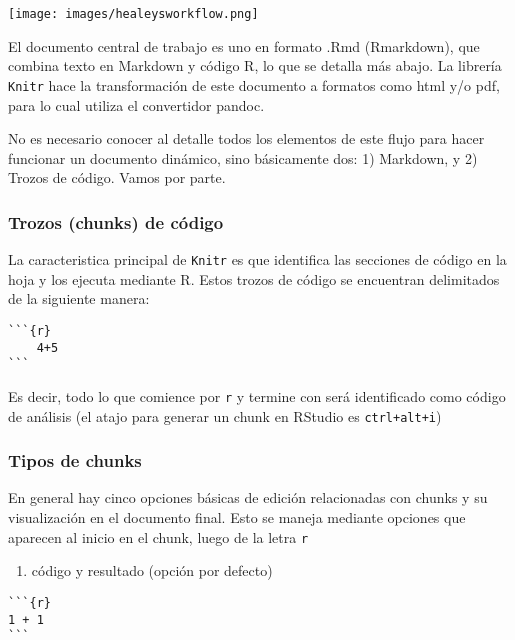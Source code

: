 \documentclass[
  11pt,
]{book}
\providecommand{\tightlist}{%
  \setlength{\itemsep}{0pt}\setlength{\parskip}{0pt}}
\begin{document}
\texttt{[image: images/healeysworkflow.png]}

El documento central de trabajo es uno en formato .Rmd (Rmarkdown), que combina texto en Markdown y código R, lo que se detalla más abajo. La librería \texttt{Knitr} hace la transformación de este documento a formatos como html y/o pdf, para lo cual utiliza el convertidor pandoc.

No es necesario conocer al detalle todos los elementos de este flujo para hacer funcionar un documento dinámico, sino básicamente dos: 1) Markdown, y 2) Trozos de código. Vamos por parte.

\hypertarget{trozos-chunks-de-cuxf3digo}{%
\subsubsection{Trozos (chunks) de código}\label{trozos-chunks-de-cuxf3digo}}

La caracteristica principal de \texttt{Knitr} es que identifica las secciones de código en la hoja y los ejecuta mediante R. Estos trozos de código se encuentran delimitados de la siguiente manera:

\begin{verbatim}
```{r}
    4+5
```
\end{verbatim}

Es decir, todo lo que comience por \texttt{\textasciigrave{}\textasciigrave{}\textasciigrave{}r} y termine con \texttt{\textasciigrave{}\textasciigrave{}\textasciigrave{}} será identificado como código de análisis (el atajo para generar un chunk en RStudio es \texttt{ctrl+alt+i})

\hypertarget{tipos-de-chunks}{%
\subsubsection{Tipos de chunks}\label{tipos-de-chunks}}

En general hay cinco opciones básicas de edición relacionadas con chunks y su visualización en el documento final. Esto se maneja mediante opciones que aparecen al inicio en el chunk, luego de la letra \texttt{r}

\begin{enumerate}
\def\labelenumi{\arabic{enumi}.}
\tightlist
\item
  código y resultado (opción por defecto)
\end{enumerate}

\begin{verbatim}
```{r}
1 + 1
```
\end{verbatim}
\end{document}
